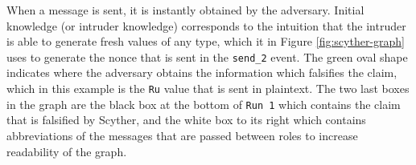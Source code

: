 When a message is sent, it is instantly obtained by the adversary. Initial knowledge (or intruder knowledge) corresponds to the intuition that the intruder is able to generate fresh values of any type, which it in Figure \ref{fig:scyther-graph} uses to generate the nonce that is sent in the \texttt{send\_2} event. The green oval shape indicates where the adversary obtains the information which falsifies the claim, which in this example is the \texttt{Ru} value that is sent in plaintext. The two last boxes in the graph are the black box at the bottom of \texttt{Run 1} which contains the claim that is falsified by Scyther, and the white box to its right which contains abbreviations of the messages that are passed between roles to increase readability of the graph.


